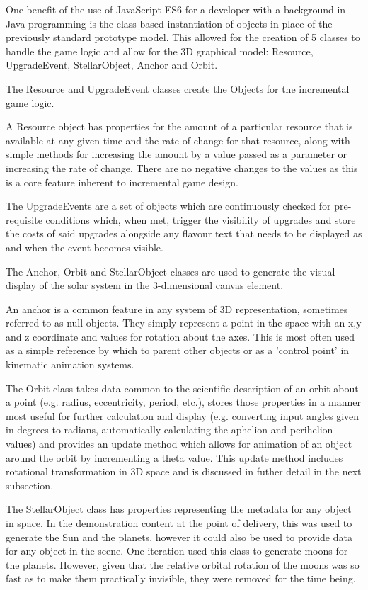 \documentclass[twoside]{bhamthesis}
\begin{document}
One benefit of the use of JavaScript ES6 for a developer with a background in Java programming is the class based instantiation of objects in place of the previously standard prototype model. This allowed for the creation of 5 classes to handle the game logic and allow for the 3D graphical model: Resource, UpgradeEvent, StellarObject, Anchor and Orbit.

The Resource and UpgradeEvent classes create the Objects for the incremental game logic.

A Resource object has properties for the amount of a particular resource that is available at any given time and the rate of change for that resource, along with simple methods for increasing the amount by a value passed as a parameter or increasing the rate of change. There are no negative changes to the values as this is a core feature inherent to incremental game design.

The UpgradeEvents are a set of objects which are continuously checked for pre-requisite conditions which, when met, trigger the visibility of upgrades and store the costs of said upgrades alongside any flavour text that needs to be displayed as and when the event becomes visible.

The Anchor, Orbit and StellarObject classes are used to generate the visual display of the solar system in the 3-dimensional canvas element.

An anchor is a common feature in any system of 3D representation, sometimes referred to as null objects. They simply represent a point in the space with an x,y and z coordinate and values for rotation about the axes. This is most often used as a simple reference by which to parent other objects or as a 'control point' in kinematic animation systems.

The Orbit class takes data common to the scientific description of an orbit about a point (e.g. radius, eccentricity, period, etc.), stores those properties in a manner most useful for further calculation and display (e.g. converting input angles given in degrees to radians, automatically calculating the aphelion and perihelion values) and provides an update method which allows for animation of an object around the orbit by incrementing a theta value. This update method includes rotational transformation in 3D space and is discussed in futher detail in the next subsection.

The StellarObject class has properties representing the metadata for any object in space. In the demonstration content at the point of delivery, this was used to generate the Sun and the planets, however it could also be used to provide data for any object in the scene. One iteration used this class to generate moons for the planets. However, given that the relative orbital rotation of the moons was so fast as to make them practically invisible, they were removed for the time being.
\end{document}
